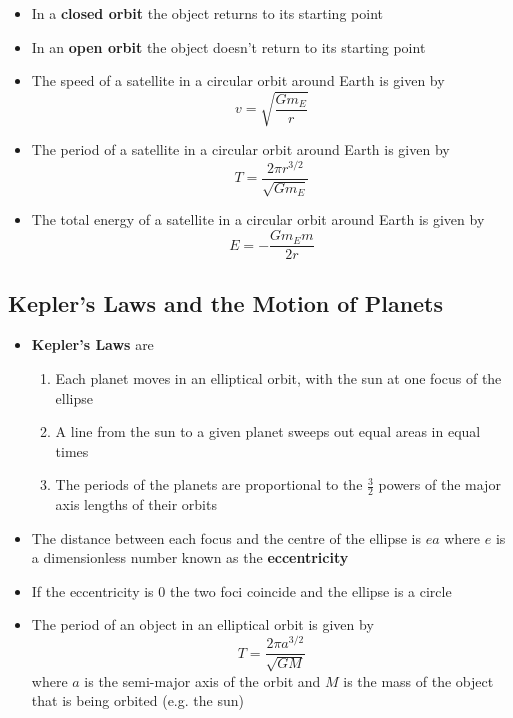 \documentclass{article}
\begin{document}
\begin{itemize}
    \item In a \textbf{closed orbit} the object returns to its starting point

    \item In an \textbf{open orbit} the object doesn't return to its starting point

    \item The speed of a satellite in a circular orbit around Earth is given by \[v=\sqrt{\frac{Gm_E}{r}}\]

    \item The period of a satellite in a circular orbit around Earth is given by \[T=\frac{2\pi r^{3/2}}{\sqrt{Gm_E}}\]

    \item The total energy of a satellite in a circular orbit around Earth is given by \[E=-\frac{Gm_Em}{2r}\]
\end{itemize}

\subsection{Kepler's Laws and the Motion of Planets}

\begin{itemize}
    \item \textbf{Kepler's Laws} are

          \begin{enumerate}
              \item Each planet moves in an elliptical orbit, with the sun at one focus of the ellipse

              \item A line from the sun to a given planet sweeps out equal areas in equal times

              \item The periods of the planets are proportional to the $\frac{3}{2}$ powers of the major axis lengths of their orbits
          \end{enumerate}

    \item The distance between each focus and the centre of the ellipse is $ea$ where $e$ is a dimensionless number known as the \textbf{eccentricity}

    \item If the eccentricity is 0 the two foci coincide and the ellipse is a circle

    \item The period of an object in an elliptical orbit is given by \[T = \frac {2\pi a^{3/2}}{\sqrt{GM}}\] where $a$ is the semi-major axis of the orbit and $M$ is the mass of the object that is being orbited (e.g. the sun)
\end{itemize}
\end{document}
